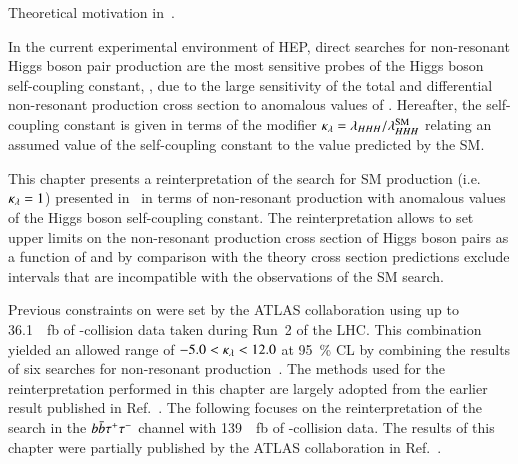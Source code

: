 Theoretical motivation in~.



In the current experimental environment of HEP, direct searches for
non-resonant Higgs boson pair production are the most sensitive probes
of the Higgs boson self-coupling constant, \lambdahhh, due to the
large sensitivity of the total and differential non-resonant \HH
production cross section to anomalous values of \lambdahhh. Hereafter,
the self-coupling constant is given in terms of the modifier
$\kappa_{\lambda} = \lambda_{HHH} / \lambda_{HHH}^{\text{SM}}$ relating an assumed
value of the self-coupling constant to the value predicted by the SM.


This chapter presents a reinterpretation of the search for SM \HH
production (i.e.\ $\kappa_{\lambda} = 1$) presented in~ in
terms of non-resonant \HH production with anomalous values of the
Higgs boson self-coupling constant. The reinterpretation allows to set
upper limits on the non-resonant production cross section of Higgs
boson pairs as a function of \klambda and by comparison with the
theory cross section predictions exclude \klambda intervals that are
incompatible with the observations of the SM \HH search.



Previous constraints on \klambda were set by the ATLAS collaboration
using up to \SI{36.1}{\per\femto\barn} of \pp-collision data taken
during Run~2 of the LHC. This combination yielded an allowed range of
$-5.0 < \kappa_{\lambda} < 12.0$ at \SI{95}{\percent} CL by combining the
results of six searches for non-resonant \HH
production~\cite{HDBS-2018-58}. The methods used for the
reinterpretation performed in this chapter are largely adopted from
the earlier result published in Ref.~\cite{HDBS-2018-58}. The
following focuses on the reinterpretation of the search in the
$b\bar{b}\tau^{+} \tau^{-}$ channel with \SI{139}{\per\femto\barn} of
\pp-collision data. The results of this chapter were partially
published by the ATLAS collaboration in
Ref.~\cite{ATLAS-CONF-2021-052}.


